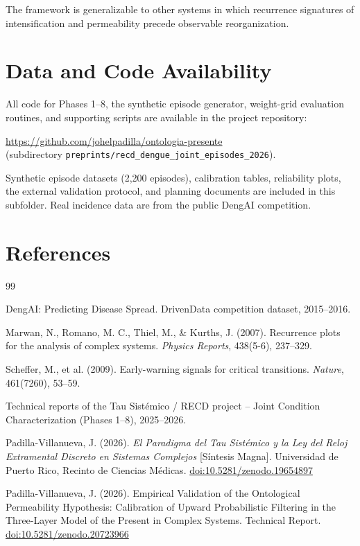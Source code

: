 \documentclass[11pt,a4paper]{article}
\newcommand{\doi}[1]{\href{https://doi.org/#1}{doi:#1}}
\begin{document}
The framework is generalizable to other systems in which recurrence signatures of intensification and permeability precede observable reorganization.

\section*{Data and Code Availability}

\begin{sloppypar}
All code for Phases 1--8, the synthetic episode generator, weight-grid evaluation routines, and supporting scripts are available in the project repository:

\url{https://github.com/johelpadilla/ontologia-presente}\\
(subdirectory \texttt{preprints/recd\_dengue\_joint\_episodes\_2026}).

Synthetic episode datasets (2,200 episodes), calibration tables, reliability plots, the external validation protocol, and planning documents are included in this subfolder. Real incidence data are from the public DengAI competition.
\end{sloppypar}

\section*{References}
\begin{thebibliography}{99}

DengAI: Predicting Disease Spread. DrivenData competition dataset, 2015--2016.

Marwan, N., Romano, M. C., Thiel, M., \& Kurths, J. (2007). Recurrence plots for the analysis of complex systems. \textit{Physics Reports}, 438(5-6), 237--329.

Scheffer, M., et al. (2009). Early-warning signals for critical transitions. \textit{Nature}, 461(7260), 53--59.

Technical reports of the Tau Sistémico / RECD project – Joint Condition Characterization (Phases 1--8), 2025--2026.

Padilla-Villanueva, J. (2026). \textit{El Paradigma del Tau Sistémico y la Ley del Reloj Extramental Discreto en Sistemas Complejos} [Síntesis Magna]. Universidad de Puerto Rico, Recinto de Ciencias Médicas. \doi{10.5281/zenodo.19654897}

Padilla-Villanueva, J. (2026). Empirical Validation of the Ontological Permeability Hypothesis: Calibration of Upward Probabilistic Filtering in the Three-Layer Model of the Present in Complex Systems. Technical Report. \doi{10.5281/zenodo.20723966}

\end{thebibliography}
\end{document}
